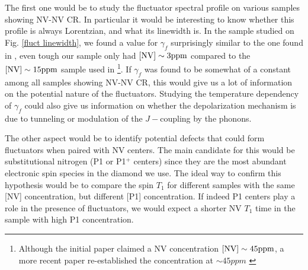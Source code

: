 \documentclass[a4paper,11pt]{report}
\begin{document}
The first one would be to study the fluctuator spectral profile on various samples showing NV-NV CR. In particular it would be interesting to know whether this profile is always Lorentzian, and what its linewidth is. In the sample studied on Fig. \ref{fluct linewidth}, we found a value for $\gamma_f$ surprisingly similar to the one found in \citep{choi2017depolarization}, even tough our sample only had $[\rm NV] \sim 3 ppm$ compared to the $[\rm NV] \sim 15 ppm$ sample used in \citep{choi2017depolarization} \footnote{Although the initial paper claimed a NV concentration $[\rm NV] \sim 45 ppm$, a more recent paper re-established the concentration at $\sim 45 ppm$ \citep{zhou2020quantum}}. If $\gamma_f$ was found to be somewhat of a constant among all samples showing NV-NV CR, this would give us a lot of information on the potential nature of the fluctuators. Studying the temperature dependency of $\gamma_f$ could also give us information on whether the depolarization mechanism is due to tunneling or modulation of the $J-$coupling by the phonons.

The other aspect would be to identify potential defects that could form fluctuators when paired with NV centers. The main candidate for this would be substitutional nitrogen (P1 or P1$^+$ centers) since they are the most abundant electronic spin species in the diamond we use. The ideal way to confirm this hypothesis would be to compare the spin $T_1$ for  different samples with the same [NV] concentration, but different [P1] concentration. If indeed P1 centers play a role in the presence of fluctuators, we would expect a shorter NV $T_1$ time in the sample with high P1 concentration.


\printbibliography
\end{document}
